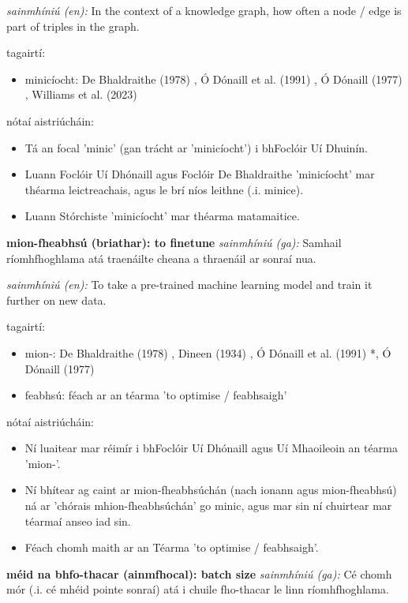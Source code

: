 \documentclass{article}
\begin{document}
\textit{sainmhíniú (en):} In the context of a knowledge graph, how often a node / edge is part of triples in the graph.

tagairtí:
\begin{itemize}
	\item minicíocht: De Bhaldraithe (1978) \cite{de-bhaldraithe}, Ó Dónaill et al. (1991) \cite{focloir-beag}, Ó Dónaill (1977) \cite{odonaill}, Williams et al. (2023) \cite{storchiste}
\end{itemize}

nótaí aistriúcháin:
\begin{itemize}
	\item Tá an focal 'minic' (gan trácht ar 'minicíocht') i bhFoclóir Uí Dhuinín.
	\item Luann Foclóir Uí Dhónaill agus Foclóir De Bhaldraithe 'minicíocht' mar théarma leictreachais, agus le brí níos leithne (.i. minice).
	\item Luann Stórchiste 'minicíocht' mar théarma matamaitice.
\end{itemize}


\textbf{mion-fheabhsú (briathar): to finetune}
\textit{sainmhíniú (ga):} Samhail ríomhfhoghlama atá traenáilte cheana a thraenáil ar sonraí nua.

\textit{sainmhíniú (en):} To take a pre-trained machine learning model and train it further on new data.

tagairtí:
\begin{itemize}
	\item mion-: De Bhaldraithe (1978) \cite{de-bhaldraithe}, Dineen (1934) \cite{dineen}, Ó Dónaill et al. (1991) \cite{focloir-beag}*, Ó Dónaill (1977) \cite{odonaill}
	\item feabhsú: féach ar an téarma 'to optimise / feabhsaigh'
\end{itemize}

nótaí aistriúcháin:
\begin{itemize}
	\item Ní luaitear mar réimír i bhFoclóir Uí Dhónaill agus Uí Mhaoileoin an téarma 'mion-'.
	\item Ní bhítear ag caint ar mion-fheabhsúchán (nach ionann agus mion-fheabhsú) ná ar 'chórais mhion-fheabhsúchán' go minic, agus mar sin ní chuirtear mar téarmaí anseo iad sin.
	\item Féach chomh maith ar an Téarma 'to optimise / feabhsaigh'.
\end{itemize}


\textbf{méid na bhfo-thacar (ainmfhocal): batch size}
\textit{sainmhíniú (ga):} Cé chomh mór (.i. cé mhéid pointe sonraí) atá i chuile fho-thacar le linn ríomhfhoghlama.
\end{document}
